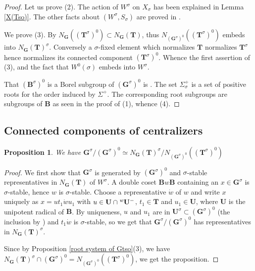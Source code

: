 \documentclass{amsart}
\newtheorem{proposition}[equation]{Proposition}
\numberwithin{equation}{section}
\theoremstyle{definition}
\theoremstyle{remark}
\newcommand\bB{{\mathbf B}}
\newcommand\bG{{\mathbf G}}
\newcommand\bT{{\mathbf T}}
\newcommand\bU{{\mathbf U}}
\newcommand\Gs{{\bG^\sigma}}
\newcommand\Gso{{(\Gs)^0}}
\newcommand\Tso{{(\bT^\sigma)^0}}
\newcommand\Ts{{\bT^\sigma}}
\newcommand\lexp[2]{\kern\scriptspace\vphantom{#2}^{#1}\kern-\scriptspace#2}
\newcommand\SL{\mathrm{SL}}
\newcommand\PGL{\mathrm{PGL}}
\begin{document}
\begin{proof}

Let  us  prove  (2).  The  action  of  $W^\sigma$  on  $X_\sigma$ has been
explained  in Lemma \ref{X(Tso)}. The other facts about $(W^\sigma,S_\sigma)$ are
proved in \cite[1.32]{St}.

We prove (3). By \cite[1.8(iv)]{grnc} $N_\bG(\Tso)\subset N_\bG(\bT)$, thus
$N_\Gso(\Tso)$ embeds into $N_\bG(\bT)^\sigma$. Conversely a $\sigma$-fixed
element  which  normalizes  $\bT$  normalizes  $\Ts$  hence  normalizes its
connected  component $\Tso$. Whence  the first assertion  of (3), and the
fact that $W^0(\sigma)$  embeds into  $W^\sigma$. 

That   $(\bB^\sigma)^0$  is  a  Borel   subgroup  of  $\Gso$  is  \cite[1.8
(iii)]{grnc}.  The set $\Sigma_\sigma^+$ is a set of positive roots for the
order induced by $\Sigma^+$. The corresponding root subgroups are subgroups
of $\bB$ as seen in the proof of (1), whence (4).
\end{proof}
\subsection*{Connected components of centralizers}
\begin{proposition}\label{AG(ts)} We have
$\Gs/\Gso\simeq N_\bG(\bT)^\sigma/N_\Gso(\Tso)$ 
\end{proposition}
\begin{proof}

We first show that  $\Gs$ is generated by $\Gso$ and
$\sigma$-stable representatives in $N_\bG(\bT)$ of $W^\sigma$. A
double  coset  $\bB  w\bB$ containing an $x\in\Gs$ is $\sigma$-stable,
hence $w$ is
$\sigma$-stable.  Choose a  representative  $\dot w  $ of $w$ and
write  $x$ uniquely as  $x=ut_1\dot w u_1$  with $u\in\bU\cap\lexp w\bU^-$,
$t_1\in\bT$ and $u_1\in\bU$, where $\bU$ is the unipotent radical of $\bB$.
By uniqueness, $u$ and $u_1$ are in $\bU^\sigma\subset\Gso$ (the inclusion
by \cite[1.8(i)]{grnc}) and $t_1\dot w$ is $\sigma$-stable, so we get that
$\Gs/\Gso$ has representatives in $N_\bG(\bT)^\sigma$.

Since by Proposition \ref{root system of Gtso}(3),
we have $N_\bG(\bT)^\sigma\cap\Gso=N_\Gso(\Tso)$, we get the proposition.
\end{proof}
\end{document}
